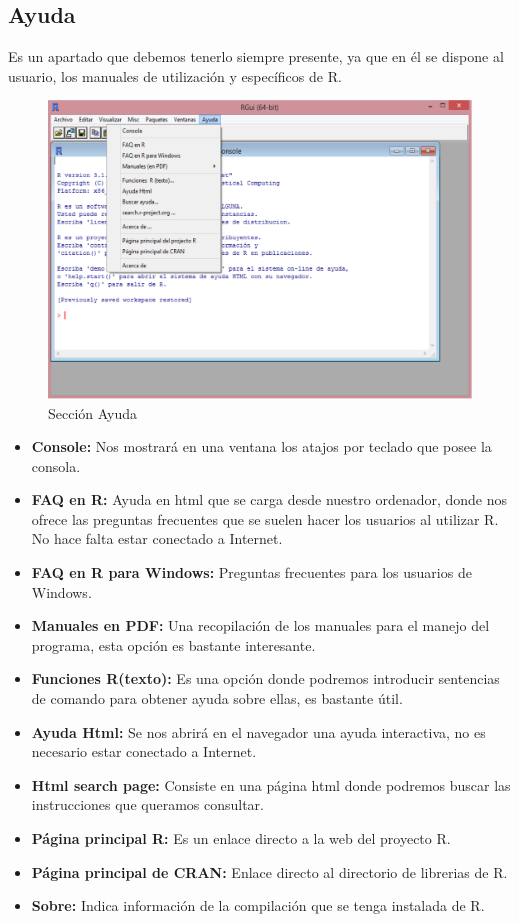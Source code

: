 \documentclass[11pt,a4paper,oneside]{book}\usepackage[]{graphicx}\usepackage[]{color}
\begin{document}
\begin{itemize}
\subsection{Ayuda} 
  
Es un apartado que debemos tenerlo siempre presente, ya que en él se dispone al usuario, los manuales de utilización y específicos de R.
  \begin{figure}[H]
  \centering
  \includegraphics[scale=.4]{figuras/ayuda.eps}
  \caption{Sección Ayuda}
  \label{ayuda}
  \end{figure}

\begin{itemize}
      \item {\bf Console:} Nos mostrará en una ventana los atajos por teclado que posee la consola.
      \item {\bf FAQ en R:} Ayuda en html que se carga desde nuestro ordenador, donde nos ofrece las preguntas frecuentes que se suelen hacer los usuarios al utilizar R. No hace falta estar conectado a Internet.
      \item {\bf FAQ en R para Windows:} Preguntas frecuentes para los usuarios de Windows.
      \item {\bf Manuales en PDF:} Una recopilación de los manuales para el manejo del programa, esta opción es bastante interesante.
      \item {\bf Funciones R(texto):} Es una opción donde podremos introducir sentencias de comando para obtener ayuda sobre ellas, es bastante útil.
      \item {\bf Ayuda Html:} Se nos abrirá en el navegador una ayuda interactiva, no es necesario estar conectado a Internet.
      \item {\bf Html search page:} Consiste en una página html donde podremos buscar las instrucciones que queramos consultar.
      \item {\bf Página principal R:} Es un enlace directo a la web del proyecto R.
      \item {\bf Página principal de CRAN:} Enlace directo al directorio de librerias de R.
      \item {\bf Sobre:} Indica información de la compilación que se tenga instalada de R.
\end{itemize}



\end{itemize}
\end{document}
